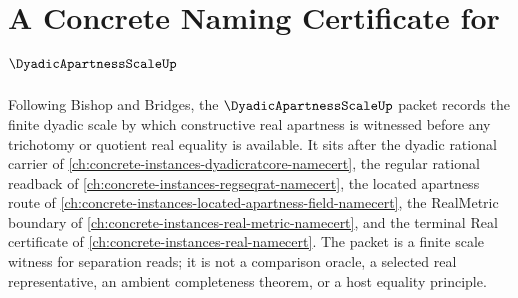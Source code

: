 \chapter{A Concrete Naming Certificate for $\DyadicApartnessScaleUp$}
\label{ch:concrete-instances-dyadic-apartness-scale-namecert}

Following Bishop and Bridges, the $\DyadicApartnessScaleUp$ packet records the finite dyadic scale by which constructive real apartness is witnessed before any trichotomy or quotient real equality is available. It sits after the dyadic rational carrier of \autoref{ch:concrete-instances-dyadicratcore-namecert}, the regular rational readback of \autoref{ch:concrete-instances-regseqrat-namecert}, the located apartness route of \autoref{ch:concrete-instances-located-apartness-field-namecert}, the RealMetric boundary of \autoref{ch:concrete-instances-real-metric-namecert}, and the terminal Real certificate of \autoref{ch:concrete-instances-real-namecert}. The packet is a finite scale witness for separation reads; it is not a comparison oracle, a selected real representative, an ambient completeness theorem, or a host equality principle.

